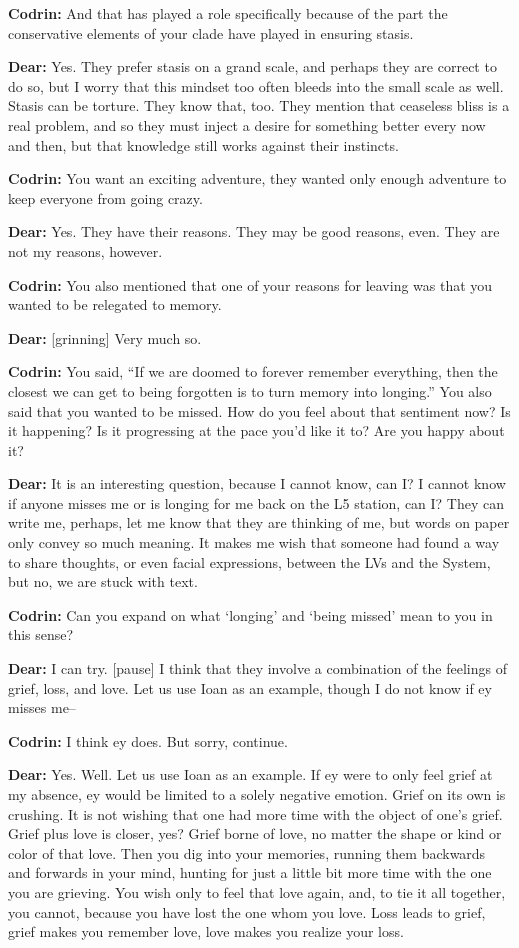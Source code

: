 \textbf{Codrin:} And that has played a role specifically because of the part the conservative elements of your clade have played in ensuring stasis.

\textbf{Dear:} Yes. They prefer stasis on a grand scale, and perhaps they are correct to do so, but I worry that this mindset too often bleeds into the small scale as well. Stasis can be torture. They know that, too. They mention that ceaseless bliss is a real problem, and so they must inject a desire for something better every now and then, but that knowledge still works against their instincts.

\textbf{Codrin:} You want an exciting adventure, they wanted only enough adventure to keep everyone from going crazy.

\textbf{Dear:} Yes. They have their reasons. They may be good reasons, even. They are not my reasons, however.

\textbf{Codrin:} You also mentioned that one of your reasons for leaving was that you wanted to be relegated to memory.

\textbf{Dear:} {[}grinning{]} Very much so.

\textbf{Codrin:} You said, ``If we are doomed to forever remember everything, then the closest we can get to being forgotten is to turn memory into longing.'' You also said that you wanted to be missed. How do you feel about that sentiment now? Is it happening? Is it progressing at the pace you'd like it to? Are you happy about it?

\textbf{Dear:} It is an interesting question, because I cannot know, can I? I cannot know if anyone misses me or is longing for me back on the L5 station, can I? They can write me, perhaps, let me know that they are thinking of me, but words on paper only convey so much meaning. It makes me wish that someone had found a way to share thoughts, or even facial expressions, between the LVs and the System, but no, we are stuck with text.

\textbf{Codrin:} Can you expand on what `longing' and `being missed' mean to you in this sense?

\textbf{Dear:} I can try. {[}pause{]} I think that they involve a combination of the feelings of grief, loss, and love. Let us use Ioan as an example, though I do not know if ey misses me--

\textbf{Codrin:} I think ey does. But sorry, continue.

\textbf{Dear:} Yes. Well. Let us use Ioan as an example. If ey were to only feel grief at my absence, ey would be limited to a solely negative emotion. Grief on its own is crushing. It is not wishing that one had more time with the object of one's grief. Grief plus love is closer, yes? Grief borne of love, no matter the shape or kind or color of that love. Then you dig into your memories, running them backwards and forwards in your mind, hunting for just a little bit more time with the one you are grieving. You wish only to feel that love again, and, to tie it all together, you cannot, because you have lost the one whom you love. Loss leads to grief, grief makes you remember love, love makes you realize your loss.

